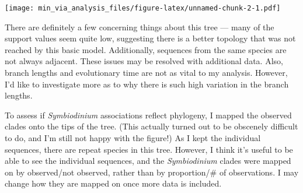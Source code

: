 \documentclass[]{article}
\begin{document}
\texttt{[image: min\_via\_analysis\_files/figure-latex/unnamed-chunk-2-1.pdf]}

There are definitely a few concerning things about this tree --- many of
the support values seem quite low, suggesting there is a better topology
that was not reached by this basic model. Additionally, sequences from
the same species are not always adjacent. These issues may be resolved
with additional data. Also, branch lengths and evolutionary time are not
as vital to my analysis. However, I'd like to investigate more as to why
there is such high variation in the branch lengths.

To assess if \emph{Symbiodinium} associations reflect phylogeny, I
mapped the observed clades onto the tips of the tree. (This actually
turned out to be obscenely difficult to do, and I'm still not happy with
the figure!) As I kept the individual sequences, there are repeat
species in this tree. However, I think it's useful to be able to see the
individual sequences, and the \emph{Symbiodinium} clades were mapped on
by observed/not observed, rather than by proportion/\# of observations.
I may change how they are mapped on once more data is included.
\end{document}
